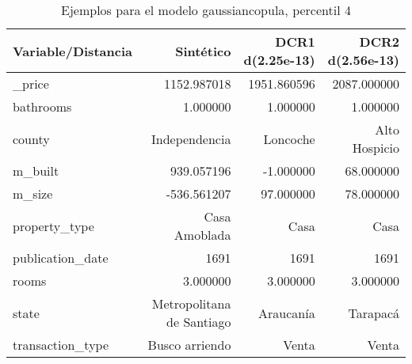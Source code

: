 \begin{table}[H]
\centering
\fontsize{10}{14}\selectfont
\caption{Ejemplos para el modelo gaussiancopula, percentil 4}
\label{table-example-economicos-b-1-gaussiancopula-4p}
\begin{tabular}{|l|r|r|r|}
\hline
\rowcolor[gray]{0.8}
Variable/Distancia & Sintético & DCR1 d(2.25e-13) & DCR2 d(2.56e-13) \\
\hline \_price & \cellcolor[rgb]{0.9, 0.54, 0.52} 1152.987018 & 1951.860596 & 2087.000000 \\
\hline bathrooms & \cellcolor[rgb]{0.9, 0.54, 0.52} 1.000000 & \cellcolor[rgb]{0.9, 0.54, 0.52} 1.000000 & \cellcolor[rgb]{0.9, 0.54, 0.52} 1.000000 \\
\hline county & \cellcolor[rgb]{0.9, 0.54, 0.52} Independencia & Loncoche & Alto Hospicio \\
\hline m\_built & \cellcolor[rgb]{0.9, 0.54, 0.52} 939.057196 & -1.000000 & 68.000000 \\
\hline m\_size & \cellcolor[rgb]{0.9, 0.54, 0.52} -536.561207 & 97.000000 & 78.000000 \\
\hline property\_type & \cellcolor[rgb]{0.9, 0.54, 0.52} Casa Amoblada & Casa & Casa \\
\hline publication\_date & \cellcolor[rgb]{0.9, 0.54, 0.52} 1691 & \cellcolor[rgb]{0.9, 0.54, 0.52} 1691 & \cellcolor[rgb]{0.9, 0.54, 0.52} 1691 \\
\hline rooms & \cellcolor[rgb]{0.9, 0.54, 0.52} 3.000000 & \cellcolor[rgb]{0.9, 0.54, 0.52} 3.000000 & \cellcolor[rgb]{0.9, 0.54, 0.52} 3.000000 \\
\hline state & \cellcolor[rgb]{0.9, 0.54, 0.52} Metropolitana de Santiago & Araucanía & Tarapacá \\
\hline transaction\_type & \cellcolor[rgb]{0.9, 0.54, 0.52} Busco arriendo & Venta & Venta \\
\hline
\end{tabular}
\end{table}

